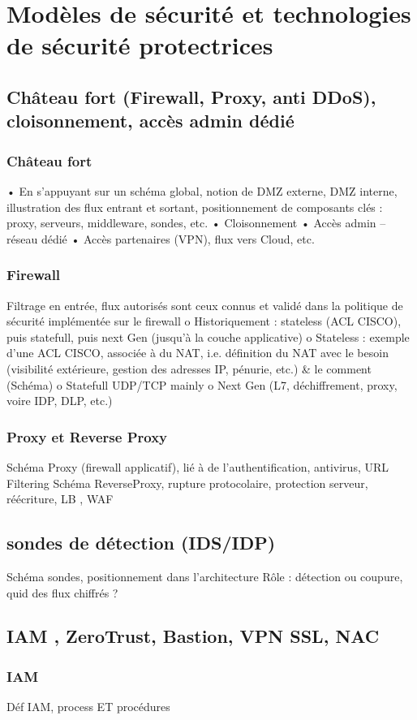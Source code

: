 

\section{Modèles de sécurité et technologies de sécurité protectrices}
\subsection{Château fort (Firewall, Proxy, anti DDoS), cloisonnement, accès admin dédié}
\subsubsection{Château fort}
•	En s’appuyant sur un schéma global, notion de DMZ externe, DMZ interne, illustration des flux entrant et sortant, positionnement de composants clés : proxy, serveurs, middleware, sondes, etc.
•	Cloisonnement
•	Accès admin – réseau dédié
•	Accès partenaires (VPN), flux vers Cloud, etc.
\subsubsection{Firewall}
Filtrage en entrée, flux autorisés sont ceux connus et validé dans la politique de sécurité implémentée sur le firewall
o	Historiquement : stateless (ACL CISCO), puis statefull, puis next Gen (jusqu’à la couche applicative)
o	Stateless : exemple d’une ACL CISCO, associée à du NAT, i.e. définition du NAT avec le besoin (visibilité extérieure, gestion des adresses IP, pénurie, etc.) \& le comment (Schéma)
o	Statefull UDP/TCP mainly
o	Next Gen (L7, déchiffrement, proxy, voire IDP, DLP, etc.)
\subsubsection{Proxy et Reverse Proxy}
Schéma Proxy (firewall applicatif), lié à de l’authentification, antivirus, URL Filtering
Schéma ReverseProxy, rupture protocolaire, protection serveur, réécriture, LB , WAF
\subsection{sondes de détection (IDS/IDP)}
Schéma sondes, positionnement dans l’architecture
Rôle : détection ou coupure, quid des flux chiffrés ?
\subsection{IAM , ZeroTrust, Bastion, VPN SSL, NAC}
\subsubsection{IAM}
Déf IAM, process ET procédures
